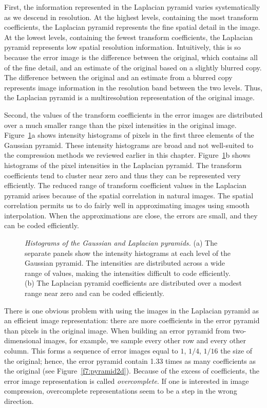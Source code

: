 First, the information represented in the Laplacian pyramid varies
systematically as we descend in resolution.  At the highest levels,
containing the most transform coefficients, the Laplacian pyramid
represents the fine spatial detail in the image. At the lowest levels,
containing the fewest transform coefficients, the Laplacian pyramid
represents low spatial resolution information.  Intuitively, this is
so because the error image is the difference between the original,
which contains all of the fine detail, and an estimate of the original
based on a slightly blurred copy.  The difference between the original
and an estimate from a blurred copy represents image information in
the resolution band between the two levels.  Thus, the Laplacian
pyramid is a multiresolution representation of the original image.

Second, the values of the transform coefficients in the error images
are distributed over a much smaller range than the pixel intensities
in the original image.  Figure~\ref{f7:pyramidEntropy}a shows
intensity histograms of pixels in the first three elements of the
Gaussian pyramid.  These intensity histograms are broad and not
well-suited to the compression methods we reviewed earlier in this
chapter.  Figure~\ref{f7:pyramidEntropy}b shows histograms of the
pixel intensities in the Laplacian pyramid.  The transform
coefficients tend to cluster near zero and thus they can be
represented very efficiently.  The reduced range of transform
coefficient values in the Laplacian pyramid arises because of the
spatial correlation in natural images.  The spatial correlation
permits us to do fairly well in approximating images using smooth
interpolation.  When the approximations are close, the errors are
small, and they can be coded efficiently.
\begin{figure}
\centerline{
}
\caption[Pixel Entropy and Coefficient Entropy]{
{\em Histograms of the Gaussian and Laplacian pyramids.}  (a) The
separate panels show the intensity histograms at each level of the
Gaussian pyramid.  The intensities are distributed across a wide range
of values, making the intensities difficult to code efficiently.  (b)
The Laplacian pyramid coefficients are distributed over a modest range
near zero and can be coded efficiently.}
\label{f7:pyramidEntropy}
\end{figure}

There is one obvious problem with using the images in the Laplacian
pyramid as an efficient image representation: there are more
coefficients in the error pyramid than pixels in the original image.
When building an error pyramid from two-dimensional images, for
example, we sample every other row and every other column.  This forms
a sequence of error images equal to $1$, $1/4$, $1/{16}$ the size of
the original; hence, the error pyramid contain 1.33 times as many
coefficients as the original (see Figure~\ref{f7:pyramid2d}).  Because
of the excess of coefficients, the error image representation is
called {\em overcomplete}.  If one is interested in image compression,
overcomplete representations seem to be a step in the wrong direction.

